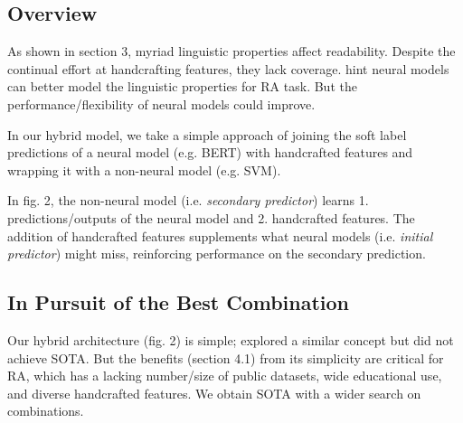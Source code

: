 \documentclass[11pt]{article}
\begin{document}
\subsection{Overview}
As shown in section 3, myriad linguistic properties affect readability. Despite the continual effort at handcrafting features, they lack coverage. \citet{deutsch-etal-2020-linguistic} hint neural models can better model the linguistic properties for RA task. But the performance/flexibility of neural models could improve. 

In our hybrid model, we take a simple approach of joining the soft label predictions of a neural model (e.g. BERT) with handcrafted features and wrapping it with a non-neural model (e.g. SVM). 

In fig. 2, the non-neural model (i.e. \textit{secondary predictor}) learns 1. predictions/outputs of the neural model and 2. handcrafted features. The addition of handcrafted features supplements what neural models (i.e. \textit{initial predictor}) might miss, reinforcing performance on the secondary prediction.

\subsection{In Pursuit of the Best Combination}
Our hybrid architecture (fig. 2) is simple; \citet{deutsch-etal-2020-linguistic} explored a similar concept but did not achieve SOTA. But the benefits (section 4.1) from its simplicity are critical for RA, which has a lacking number/size of public datasets, wide educational use, and diverse handcrafted features. We obtain SOTA with a wider search on combinations. 
\end{document}
